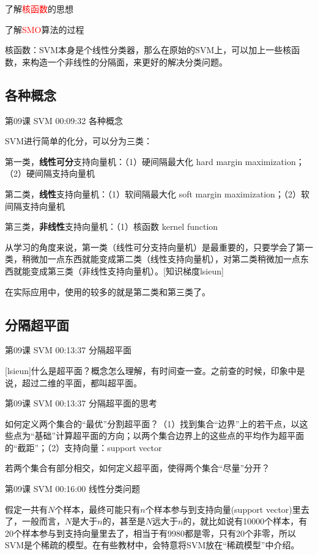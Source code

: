 \documentclass[UTF8]{ctexbook}
\begin{document}
了解\textcolor{red}{核函数}的思想

了解\textcolor{red}{SMO}算法的过程

核函数：SVM本身是个线性分类器，那么在原始的SVM上，可以加上一些核函数，来构造一个非线性的分隔面，来更好的解决分类问题。

\subsection{各种概念}

第09课 SVM 00:09:32 各种概念

SVM进行简单的化分，可以分为三类：

第一类，\textbf{线性可分}支持向量机：（1）硬间隔最大化 hard margin maximization；（2）硬间隔支持向量机

第二类，\textbf{线性}支持向量机：（1）软间隔最大化 soft margin maximization；（2）软间隔支持向量机

第三类，\textbf{非线性}支持向量机：（1）核函数 kernel function

从学习的角度来说，第一类（线性可分支持向量机）是最重要的，只要学会了第一类，稍微加一点东西就能变成第二类（线性支持向量机），对第二类稍微加一点东西就能变成第三类（非线性支持向量机）。[知识梯度lsieun]

在实际应用中，使用的较多的就是第二类和第三类了。

\subsection{分隔超平面}

第09课 SVM 00:13:37 分隔超平面

[lsieun]什么是超平面？概念怎么理解，有时间查一查。之前查的时候，印象中是说，超过二维的平面，都叫超平面。

第09课 SVM 00:13:37 分隔超平面的思考

如何定义两个集合的“最优”分割超平面？（1）找到集合“边界”上的若干点，以这些点为“基础”计算超平面的方向；以两个集合边界上的这些点的平均作为超平面的“截距”；（2）支持向量：support vector

若两个集合有部分相交，如何定义超平面，使得两个集合“尽量”分开？

第09课 SVM 00:16:00 线性分类问题

假定一共有$N$个样本，最终可能只有$n$个样本参与到支持向量(support vector)里去了，一般而言，$N$是大于$n$的，甚至是$N$远大于$n$的，就比如说有10000个样本，有20个样本参与到支持向量里去了，相当于有9980都是零，只有20个非零，所以SVM是个稀疏的模型。在有些教材中，会特意将SVM放在“稀疏模型”中介绍。
\end{document}
